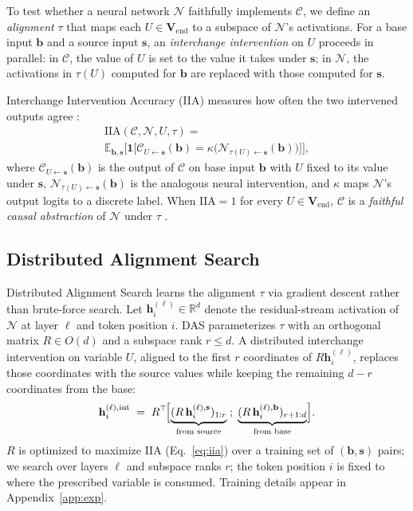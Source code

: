 \documentclass[11pt]{article}
\begin{document}
To test whether a neural network $\mathcal{N}$ faithfully implements $\mathcal{C}$, we define an \emph{alignment} $\tau$ that maps each $U \in \mathbf{V}_{\mathrm{end}}$ to a subspace of $\mathcal{N}$'s activations.
For a base input $\mathbf{b}$ and a source input $\mathbf{s}$, an \emph{interchange intervention} on $U$ proceeds in parallel:
in $\mathcal{C}$, the value of $U$ is set to the value it takes under $\mathbf{s}$;
in $\mathcal{N}$, the activations in $\tau(U)$ computed for $\mathbf{b}$ are replaced with those computed for $\mathbf{s}$.

Interchange Intervention Accuracy (IIA) measures how often the two intervened outputs agree \citep{DBLP:conf/nips/GeigerLIP21}:
%
\begin{multline}
\label{eq:iia}
\mathrm{IIA}(\mathcal{C}, \mathcal{N}, U, \tau) = \\
  \mathbb{E}_{\mathbf{b},\mathbf{s}}\!\Big[\mathbf{1}\!\big[\mathcal{C}_{U \leftarrow \mathbf{s}}(\mathbf{b}) = \kappa\big(\mathcal{N}_{\tau(U) \leftarrow \mathbf{s}}(\mathbf{b})\big)\big]\Big],
\end{multline}
%
where $\mathcal{C}_{U\!\leftarrow\!\mathbf{s}}(\mathbf{b})$ is the output of $\mathcal{C}$ on base input $\mathbf{b}$ with $U$ fixed to its value under $\mathbf{s}$, $\mathcal{N}_{\tau(U)\!\leftarrow\!\mathbf{s}}(\mathbf{b})$ is the analogous neural intervention, and $\kappa$ maps $\mathcal{N}$'s output logits to a discrete label.
When $\mathrm{IIA} = 1$ for every $U \in \mathbf{V}_{\mathrm{end}}$, $\mathcal{C}$ is a \emph{faithful causal abstraction} of $\mathcal{N}$ under $\tau$ \citep{DBLP:journals/jmlr/GeigerIZCC0AWGP25}.

\subsection{Distributed Alignment Search}
\label{sec:das}

Distributed Alignment Search \citep[DAS;][]{DBLP:conf/clear2/GeigerWPIG24} learns the alignment $\tau$ via gradient descent rather than brute-force search.
Let $\mathbf{h}_i^{(\ell)} \in \mathbb{R}^d$ denote the residual-stream activation of $\mathcal{N}$ at layer $\ell$ and token position $i$.
DAS parameterizes $\tau$ with an orthogonal matrix $R \in O(d)$ and a subspace rank $r \leq d$.
A distributed interchange intervention on variable $U$, aligned to the first $r$ coordinates of $R\mathbf{h}_i^{(\ell)}$, replaces those coordinates with the source values while keeping the remaining $d - r$ coordinates from the base:
%
\begin{equation}
\label{eq:das}
\mathbf{h}_i^{(\ell),\mathrm{int}} \;=\; R^\top\!\Bigl[\underbrace{(R\,\mathbf{h}_i^{(\ell),\mathbf{s}})_{1{:}r}}_{\text{from source}}\;;\;\underbrace{(R\,\mathbf{h}_i^{(\ell),\mathbf{b}})_{r{+}1{:}d}}_{\text{from base}}\Bigr].
\end{equation}
%
$R$ is optimized to maximize IIA (Eq.~\ref{eq:iia}) over a training set of $(\mathbf{b}, \mathbf{s})$ pairs; we search over layers $\ell$ and subspace ranks $r$; the token position $i$ is fixed to where the prescribed variable is consumed.
Training details appear in Appendix~\ref{app:exp}.
\end{document}
